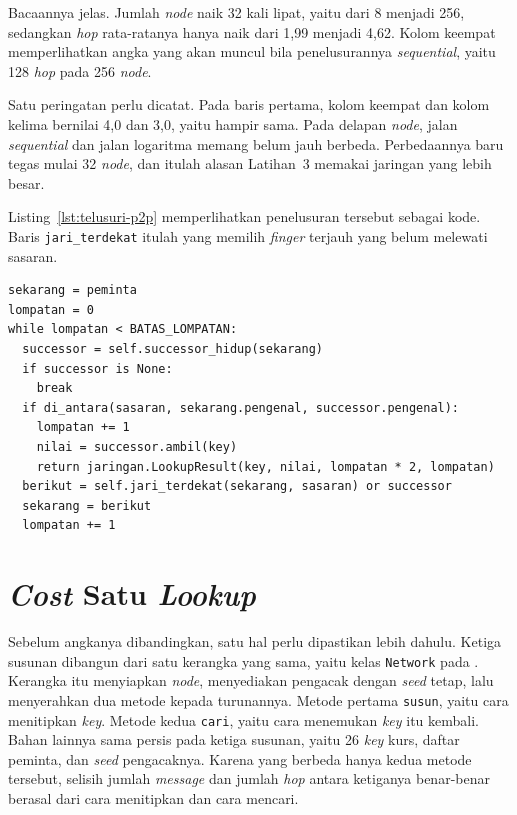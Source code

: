 Bacaannya jelas. Jumlah \textit{node} naik 32 kali lipat, yaitu dari 8 menjadi
256, sedangkan \textit{hop} rata-ratanya hanya naik dari 1,99 menjadi 4,62.
Kolom keempat memperlihatkan angka yang akan muncul bila penelusurannya \textit{sequential},
yaitu 128 \textit{hop} pada 256 \textit{node}.

Satu peringatan perlu dicatat. Pada baris pertama, kolom keempat dan kolom
kelima bernilai 4,0 dan 3,0, yaitu hampir sama. Pada delapan \textit{node},
jalan \textit{sequential} dan jalan logaritma memang belum jauh berbeda. Perbedaannya baru
tegas mulai 32 \textit{node}, dan itulah alasan Latihan~3 memakai jaringan yang
lebih besar.

Listing~\ref{lst:telusuri-p2p} memperlihatkan penelusuran tersebut sebagai kode.
Baris \texttt{jari\_terdekat} itulah yang memilih \textit{finger} terjauh yang belum
melewati sasaran.

\begin{lstlisting}[style=PythonStyle, caption={Penelusuran \textit{ring}
  lewat \textit{finger table}, tersedia di
  \berkas{sources/chapter07/cincin.py}}, label=lst:telusuri-p2p]
sekarang = peminta
lompatan = 0
while lompatan < BATAS_LOMPATAN:
  successor = self.successor_hidup(sekarang)
  if successor is None:
    break
  if di_antara(sasaran, sekarang.pengenal, successor.pengenal):
    lompatan += 1
    nilai = successor.ambil(key)
    return jaringan.LookupResult(key, nilai, lompatan * 2, lompatan)
  berikut = self.jari_terdekat(sekarang, sasaran) or successor
  sekarang = berikut
  lompatan += 1
\end{lstlisting}

\section{\textit{Cost} Satu \textit{Lookup}}
\label{sec:ongkos-p2p}

Sebelum angkanya dibandingkan, satu hal perlu dipastikan lebih dahulu.
Ketiga susunan dibangun dari satu kerangka yang sama, yaitu kelas \texttt{Network}
pada . Kerangka itu menyiapkan \textit{node},
menyediakan pengacak dengan \textit{seed} tetap, lalu menyerahkan dua metode
kepada turunannya. Metode pertama \texttt{susun}, yaitu cara menitipkan \textit{key}.
Metode kedua \texttt{cari}, yaitu cara menemukan \textit{key} itu kembali. Bahan
lainnya sama persis pada ketiga susunan, yaitu 26 \textit{key} kurs, daftar peminta,
dan \textit{seed} pengacaknya. Karena yang berbeda hanya kedua metode tersebut,
selisih jumlah \textit{message} dan jumlah \textit{hop} antara ketiganya benar-benar
berasal dari cara menitipkan dan cara mencari.


